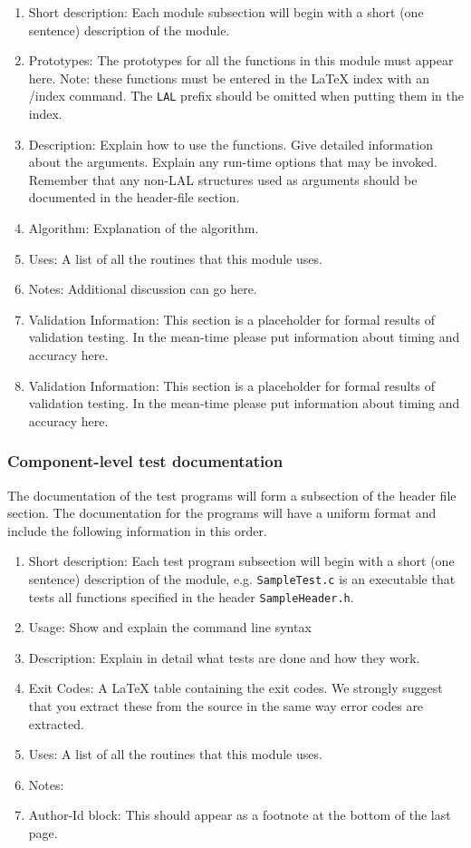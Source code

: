 \documentclass[]{ligodcc}
\begin{document}
\begin{enumerate}
   \item
   Short description: Each module subsection will begin with a
   short (one sentence) description of the module.
   \item
   Prototypes: The prototypes for all the functions in this module must
   appear here. Note: these functions must  be entered in the LaTeX index
   with an /index{} command. The {\tt LAL} prefix should be omitted when
   putting them in the index.
   \item
   Description: Explain  how to use the functions.  Give detailed
   information about the arguments. Explain any run-time options that
   may be invoked. Remember that any non-LAL structures used as
   arguments should be documented in the header-file section.
   \item
   Algorithm: Explanation of the algorithm.
   \item
   Uses: A list of all the routines that this module uses.
   \item
   Notes: Additional discussion can go here.
   \item
   Validation Information: This section is a placeholder for formal
   results of validation testing.  In the mean-time please put
   information about timing and accuracy here.
   \item
   Validation Information: This section is a placeholder for formal
   results of validation testing.  In the mean-time please put
   information about timing and accuracy here.
\end{enumerate}

\subsubsection{Component-level test documentation}

The documentation of the test programs will form a subsection of the
header file section. The  documentation for the programs will have a
uniform format and include the following information in this order.

\begin{enumerate}
\item
Short description: Each test program subsection will begin
with a short (one sentence) description of the module, e.g.
{\tt SampleTest.c} is an executable that tests all functions specified
in the header {\tt SampleHeader.h}.
\item
Usage: Show and explain the  command line syntax
\item
Description: Explain in detail what tests are done and how
they work.
\item
Exit Codes: A LaTeX table containing the exit codes. We
strongly suggest that you extract these from the source in the same
way error codes are extracted.
\item
Uses: A list of all the routines that this module uses.
\item
Notes:
\item
Author-Id block: This should appear as a footnote at the
bottom of the last page.
\end{enumerate}
\end{document}
